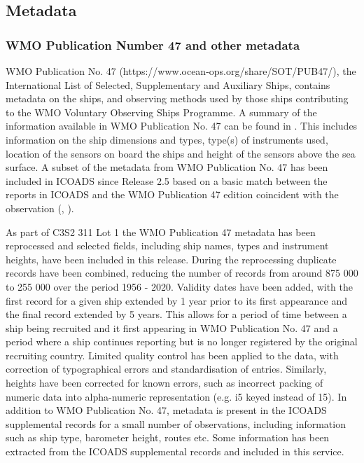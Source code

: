 \FloatBarrier
\subsection{Metadata}
\subsubsection{WMO Publication Number 47 and other metadata}
WMO Publication No. 47 (https://www.ocean-ops.org/share/SOT/PUB47/), the International List of Selected, Supplementary and Auxiliary Ships, contains metadata on the ships, and observing methods used by those ships contributing to the WMO Voluntary Observing Ships Programme. 
A summary of the information available in WMO Publication No. 47 can be found in \cite{Kent2007}. 
This includes information on the ship dimensions and types, type(s) of instruments used, location of the sensors on board the ships and height of the sensors above the sea surface.  
A subset of the metadata from WMO Publication No. 47 has been included in ICOADS since Release 2.5 based on a basic match between the reports in ICOADS and the WMO Publication 47 edition coincident with the observation (\cite{Kent2007}, \cite{Woodruff2011}).

As part of C3S2 311 Lot 1 the WMO Publication 47 metadata has been reprocessed and selected fields, including ship names, types and instrument heights, have been included in this release. 
During the reprocessing duplicate records have been combined, reducing the number of records from around 875 000 to 255 000 over the period 1956 - 2020. 
Validity dates have been added, with the first record for a given ship extended by 1 year prior to its first appearance and the final record extended by 5 years. 
This allows for a period of time between a ship being recruited and it first appearing in WMO Publication No. 47 and a period where a ship continues reporting but is no longer registered by the original recruiting country. 
Limited quality control has been applied to the data, with correction of typographical errors and standardisation of entries. 
Similarly, heights have been corrected for known errors, such as incorrect packing of numeric data into alpha-numeric representation (e.g. i5 keyed instead of 15). 
In addition to WMO Publication No. 47, metadata is present in the ICOADS supplemental records for a small number of observations, including information such as ship type, barometer height, routes etc. 
Some information has been extracted from the ICOADS supplemental records and included in this service.

